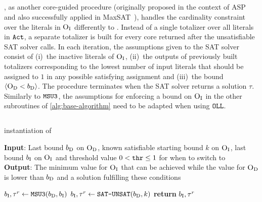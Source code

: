 \subsection{\oll{}\label{sec:oll}}

\oll{}, as another core-guided procedure (originally proposed in the context of ASP~\autocite{DBLP:conf/iclp/AndresKMS12} and also successfully applied in MaxSAT~\autocites{DBLP:conf/cp/MorgadoDM14,DBLP:journals/jsat/IgnatievMM19}), handles the cardinality constraint over the literals in $\textsc{O}_{\text{I}}$ differently to \msu{}.
Instead of a single totalizer over all literals in $\texttt{Act}$, a separate totalizer is built for every core returned after the unsatisfiable SAT solver calls.
In each iteration, the assumptions given to the SAT solver consist of (i)~the inactive literals of $\textsc{O}_{\text{I}}$, (ii)~the outputs of previously built totalizers corresponding to the lowest number of input literals that should be assigned to $1$ in any possible satisfying assignment and (iii)~the bound $\langle \textsc{O}_{\text{D}} < b_{\text{D}} \rangle$.
The procedure terminates when the SAT solver returns a solution $\tau$.
Similarly to $\texttt{MSU3}$, the assumptions for enforcing a bound on $\textsc{O}_{\text{I}}$ in the other subroutines of \cref{alg:base-algorithm} need to be adapted when using $\texttt{OLL}$.

\subsection{\msh{}\label{sec:hybrid}}

\begin{algorithm}[t]
  \caption{\msh{} instantiation of \Min{}}\label{alg:msh}
  \textbf{Input}: Last bound $b_{\text{D}}$ on $\textsc{O}_{\text{D}}$, known satisfiable starting bound $k$ on $\textsc{O}_{\text{I}}$, last bound $b_{\text{I}}$ on $\textsc{O}_{\text{I}}$ and threshold value $0<\texttt{thr}\le 1$ for when to switch to \satunsat{} \\
  \textbf{Output}: The minimum value for $\textsc{O}_{\text{I}}$ that can be achieved while the value for $\textsc{O}_{\text{D}}$ is lower than $b_{\text{D}}$ and a solution fulfilling these conditions

  \begin{algorithmic}[1]
    \IF{$|\Act| < \thr \cdot |\Obj_\inc|$}
      \STATE $b_{\text{I}},\tau^r \gets \texttt{MSU3}{}(b_{\text{D}}, b_{\text{I}})$ 
    \ENDIF
    \IF{$|\Act| \ge \thr \cdot |\Obj_\inc|$}
      \STATE $b_{\text{I}},\tau^r \gets \texttt{SAT-\allowbreak{}UNSAT}{}(b_{\text{D}}, k)$
    \ENDIF
    \STATE \textbf{return} $b_{\text{I}},\tau^r$
  \end{algorithmic}
\end{algorithm}

